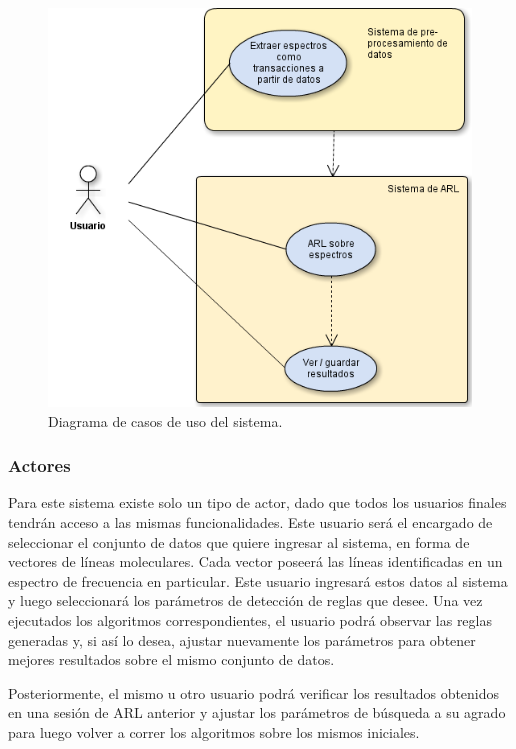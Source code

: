 \begin{figure}[h!]
\begin{center}
\includegraphics[width=14cm]{imagenes/casos_de_uso.png}
\end{center}
\vspace*{-5mm}
\caption{Diagrama de casos de uso del sistema.}
\label{fig:cases}
\end{figure}

\subsubsection{Actores}

Para este sistema existe solo un tipo de actor, dado que todos los usuarios finales tendrán acceso a las mismas funcionalidades. Este usuario será el encargado de seleccionar el conjunto de datos que quiere ingresar al sistema, en forma de vectores de líneas moleculares. Cada vector poseerá las líneas identificadas en un espectro de frecuencia en particular. Este usuario ingresará estos datos al sistema y luego seleccionará los parámetros de detección de reglas que desee. Una vez ejecutados los algoritmos correspondientes, el usuario podrá observar las reglas generadas y, si así lo desea, ajustar nuevamente los parámetros para obtener mejores resultados sobre el mismo conjunto de datos.

Posteriormente, el mismo u otro usuario podrá verificar los resultados obtenidos en una sesión de ARL anterior y ajustar los parámetros de búsqueda a su agrado para luego volver a correr los algoritmos sobre los mismos iniciales.


